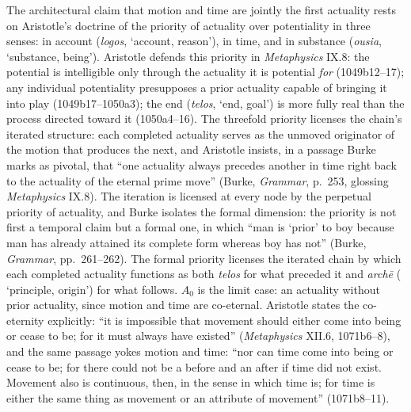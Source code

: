 The architectural claim that motion and time are jointly the first actuality rests on Aristotle's doctrine of the priority of actuality over potentiality in three senses: in account (\textit{logos},  `account, reason'), in time, and in substance (\textit{ousia},  `substance, being'). Aristotle defends this priority in \textit{Metaphysics} IX.8: the potential is intelligible only through the actuality it is potential \textit{for} (1049b12--17); any individual potentiality presupposes a prior actuality capable of bringing it into play (1049b17--1050a3); the end (\textit{telos},  `end, goal') is more fully real than the process directed toward it (1050a4--16). The threefold priority licenses the chain's iterated structure: each completed actuality serves as the unmoved originator of the motion that produces the next, and Aristotle insists, in a passage Burke marks as pivotal, that ``one actuality always precedes another in time right back to the actuality of the eternal prime move'' (Burke, \textit{Grammar}, p.~253, glossing \textit{Metaphysics} IX.8). The iteration is licensed at every node by the perpetual priority of actuality, and Burke isolates the formal dimension: the priority is not first a temporal claim but a formal one, in which ``man is `prior' to boy because man has already attained its complete form whereas boy has not'' (Burke, \textit{Grammar}, pp.~261--262). The formal priority licenses the iterated chain by which each completed actuality functions as both \textit{telos} for what preceded it and \textit{archē} ( `principle, origin') for what follows. $A_0$ is the limit case: an actuality without prior actuality, since motion and time are co-eternal. Aristotle states the co-eternity explicitly: ``it is impossible that movement should either come into being or cease to be; for it must always have existed'' (\textit{Metaphysics} XII.6, 1071b6--8), and the same passage yokes motion and time: ``nor can time come into being or cease to be; for there could not be a before and an after if time did not exist. Movement also is continuous, then, in the sense in which time is; for time is either the same thing as movement or an attribute of movement'' (1071b8--11).

